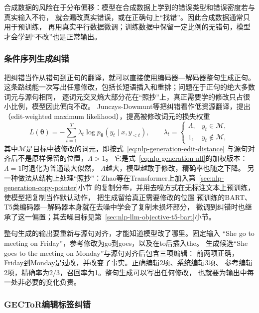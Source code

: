 合成数据的风险在于分布偏移：模型在合成数据上学到的错误类型和错误密度若与真实输入不符，
就会漏改真实错误，或在正确句上“找错”。因此合成数据通常只用于预训练，
再用真实平行数据微调；训练数据中保留一定比例的无错句，模型才会学到“不改”也是正常输出。

\subsubsection{条件序列生成纠错}
\label{sec:nlp-generation-seq-correction}

把纠错当作从错句到正句的翻译，就可以直接使用编码器—解码器整句生成正句。
这条路线能一次写出任意修改，包括长短语插入和重排；问题在于正句的绝大多数词元与源句相同，
逐词元交叉熵大部分花在“照抄”上，真正需要学的修改只占很小比例，模型因此偏向不改。
Junczys-Dowmunt等把纠错看作低资源翻译，提出
（edit-weighted maximum likelihood），提高被修改词元的损失权重
\begin{equation}
  L(\bm\theta)=-\sum_{t=1}^{T}\lambda_t\log p_{\bm\theta}(y_t\mid x,y_{<t}),\qquad
  \lambda_t=\begin{cases}\Lambda,& y_t\in\mathcal{M},\\
  1,&y_t\notin\mathcal{M},\end{cases}
  \label{eq:nlp-generation-edit-weighted}
\end{equation}
其中$\mathcal{M}$是目标中被修改的词元，即按式~\eqref{eq:nlp-generation-edit-distance}
与源句对齐后不是原样保留的位置，$\Lambda>1$。
它是式~\eqref{eq:nlp-generation-nll}的加权版本：$\Lambda=1$时退化为普通最大似然，
$\Lambda$越大，模型越敢于修改，精确率也随之下降。
另一种做法从结构上处理“照抄”：Zhao等在Transformer上加入第~\ref{sec:nlp-generation-copy-pointer}小节
的复制分布，并用去噪方式在无标注文本上预训练，使模型把复制当作默认动作，
把生成留给真正需要修改的位置
预训练的BART、T5类编码器—解码器本身就在去噪中学会了复制未损坏部分，
微调到纠错时也继承了这一偏置；其去噪目标见第~\ref{sec:nlp-llm-objective-t5-bart}小节。

整句生成的输出要重新与源句对齐，才能知道模型改了哪里。固定输入
“She go to meeting on Friday”，参考修改为go到goes，以及在to后插入the。
生成候选“She goes to the meeting on Monday”与源句对齐后包含三项编辑：
前两项正确，Friday到Monday是过改，并改变了事实。正确编辑2项、系统编辑3项、
参考编辑2项，精确率为$2/3$，召回率为1。整句生成可以写出任何修改，
也就要为输出中每一处非必要的变化负责。

\subsubsection{GECToR编辑标签纠错}
\label{sec:nlp-generation-gector}

